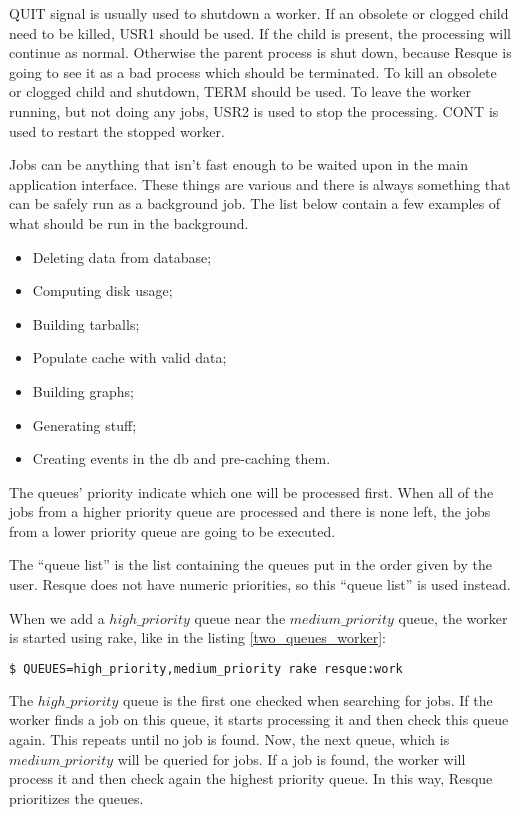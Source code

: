 QUIT signal is usually used to shutdown a worker.
If an obsolete or clogged child need to be killed, USR1 should be used. If the child is present, the processing will continue as normal. Otherwise the parent process is shut down, because Resque is going to see it as a bad process which should be terminated.
To kill an obsolete or clogged child and shutdown, TERM should be used.
To leave the worker running, but not doing any jobs, USR2 is used to stop the processing. CONT is used to restart the stopped worker.

Jobs can be anything that isn't fast enough to be waited upon in the main application interface. These things are various and there is always something that can be safely run as a background job. The list below contain a few examples of what should be run in the background.
\begin{itemize}
  \item Deleting data from database;
  \item Computing disk usage;
  \item Building tarballs;
  \item Populate cache with valid data;
  \item Building graphs;
  \item Generating stuff;
  \item Creating events in the db and pre-caching them.
\end{itemize}

The queues' priority indicate which one will be processed first. When all of the jobs from a higher priority queue are processed and there is none left, the jobs from a lower priority queue are going to be executed.

The ``queue list'' is the list containing the queues put in the order given by the user. Resque does not have numeric priorities, so this ``queue list'' is used instead. 

When we add a $high\_priority$ queue near the $medium\_priority$ queue, the worker is started using rake, like in the listing \ref{two_queues_worker}:
\begin{lstlisting}[language=Bash, caption={Working on two queues}, label=two_queues_worker]
$ QUEUES=high_priority,medium_priority rake resque:work
\end{lstlisting}

The $high\_priority$ queue is the first one checked when searching for jobs. If the worker finds a job on this queue, it starts processing it and then check this queue again. This repeats until no job is found. Now, the next queue, which is $medium\_priority$ will be queried for jobs. If a job is found, the worker will process it and then check again the highest priority queue. In this way, Resque prioritizes the queues.


\clearpage

